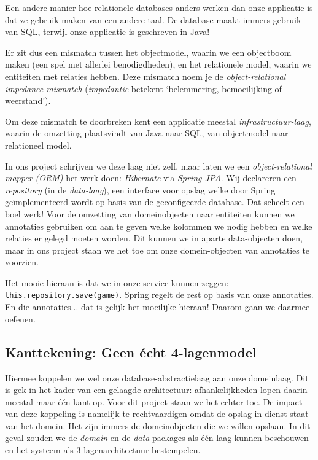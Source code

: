 Een andere manier hoe relationele databases anders werken dan onze applicatie is dat 
ze gebruik maken van een andere taal. De database maakt immers gebruik van SQL, terwijl 
onze applicatie is geschreven in Java!

Er zit dus een mismatch tussen het objectmodel, 
waarin we een objectboom maken (een spel met allerlei benodigdheden),
en het relationele model, waarin we entiteiten met relaties hebben.
Deze mismatch noem je de \textit{object-relational impedance mismatch}
(\textit{impedantie} betekent `belemmering, bemoeilijking of weerstand').

Om deze mismatch te doorbreken kent een applicatie meestal
\textit{infrastructuur-laag}, 
waarin de omzetting plaatsvindt van Java naar SQL, 
van objectmodel naar relationeel model.

In ons project schrijven we deze laag niet zelf, maar laten we 
een \textit{object-relational mapper (ORM)} het werk doen: 
\textit{Hibernate} via \textit{Spring JPA}.
Wij declareren een \textit{repository} 
(in de \textit{data-laag}), 
een interface voor opslag welke door Spring geïmplementeerd wordt
op basis van de geconfigeerde database. Dat scheelt een boel werk!
Voor de omzetting van domeinobjecten naar entiteiten kunnen 
we annotaties gebruiken om aan te geven welke kolommen we nodig hebben en welke relaties er 
gelegd moeten worden. Dit kunnen we in aparte data-objecten doen, maar
in ons project staan we het toe om onze domein-objecten van annotaties te voorzien.

Het mooie hieraan is dat we in onze service kunnen zeggen:
\texttt{this.repository.save(game)}. Spring regelt de rest op 
basis van onze annotaties. En die annotaties... dat is gelijk 
het moeilijke hieraan! Daarom gaan we daarmee oefenen.

\newpage
\subsection{Kanttekening: Geen écht 4-lagenmodel}
Hiermee koppelen we wel onze database-abstractielaag aan onze domeinlaag. Dit is 
gek in het kader van een gelaagde architectuur: afhankelijkheden lopen daarin 
meestal maar één kant op. Voor dit project staan we het echter toe.
De impact van deze koppeling is namelijk te rechtvaardigen omdat de opslag 
in dienst staat van het domein. Het zijn immers de domeinobjecten die we 
willen opslaan. In dit geval zouden we de \textit{domain} en de \textit{data}
packages als één laag kunnen beschouwen en het systeem als 3-lagenarchitectuur
bestempelen.

